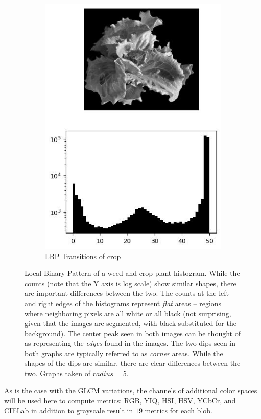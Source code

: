 \documentclass[letterpaper]{report}
\begin{document}
\begin{figure}[H]
\begin{subfigure}{0.48\linewidth}
		\includegraphics[scale=.5]{./figures/lbp-right.jpg}
		\caption{LBP Transitions of crop}
		\label{subfig:lbp-crop}		
	\end{subfigure}%
	\caption[Local Binary Pattern of a weed and crop plant histogram]{Local Binary Pattern of a weed and crop plant histogram. While the counts (note that the Y axis is log scale) show similar shapes, there are important differences between the two. The counts at the left and right edges of the histograms represent \textit{flat} areas -- regions where neighboring pixels are all white or all black (not surprising, given that the images are segmented, with black substituted for the background). The center peak seen in both images can be thought of as representing the \textit{edges} found in the images. The two dips seen in both graphs are typically referred to as \textit{corner} areas. While the shapes of the dips are similar, there are clear differences between the two. Graphs taken of $radius=5$.}
	\label{fig:lbp}
\end{figure}

As is the case with the GLCM variations, the channels of additional color spaces will be used here to compute metrics: RGB, YIQ, HSI, HSV, YCbCr, and CIELab in addition to grayscale result in $19$ metrics for each blob.
\end{document}
